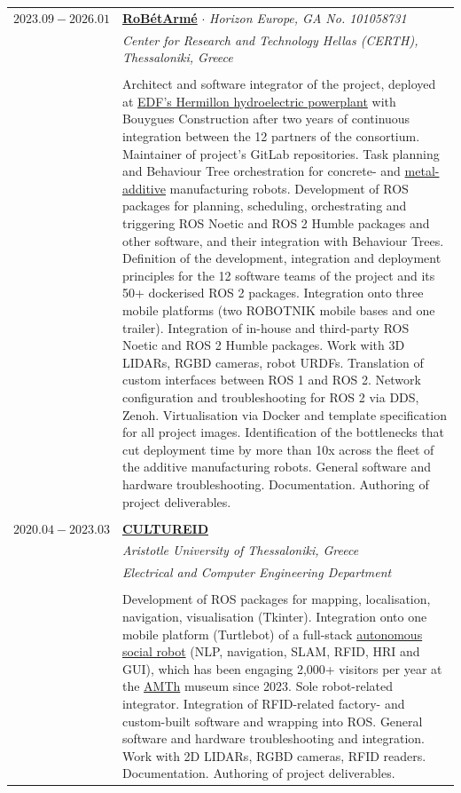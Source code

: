 \documentclass[a4paper,10pt,twoside]{article}
\begin{document}
\begin{tabular}{rp{11cm}}
$2023.09 - 2026.01$ & \href{https://www.robetarme-project.eu/}{\textbf{RoBétArmé}} $\cdot$ \textit{Horizon Europe, GA No. 101058731} \\
                           & \textit{Center for Research and Technology Hellas (CERTH), Thessaloniki, Greece}\\
\\
                           & Architect and software integrator of the project, deployed at \href{https://www.gem.wiki/Hermillon_hydroelectric_plant}{EDF's Hermillon hydroelectric powerplant} with Bouygues Construction after two years of continuous integration between the 12 partners of the consortium. Maintainer of project's GitLab repositories. Task planning and Behaviour Tree orchestration for concrete- and \href{https://www.youtube.com/watch?v=xuIbOL-MPRk}{metal-additive} manufacturing robots. Development of ROS packages for planning, scheduling, orchestrating and triggering ROS Noetic and ROS 2 Humble packages and other software, and their integration with Behaviour Trees. Definition of the development, integration and deployment principles for the 12 software teams of the project and its 50+ dockerised ROS 2 packages. Integration onto three mobile platforms (two ROBOTNIK mobile bases and one trailer). Integration of in-house and third-party ROS Noetic and ROS 2 Humble packages. Work with 3D LIDARs, RGBD cameras, robot URDFs. Translation of custom interfaces between ROS 1 and ROS 2. Network configuration and troubleshooting for ROS 2 via DDS, Zenoh. Virtualisation via Docker and template specification for all project images. Identification of the bottlenecks that cut deployment time by more than 10x across the fleet of the additive manufacturing robots. General software and hardware troubleshooting. Documentation. Authoring of project deliverables. \\
&\\
$2020.04 - 2023.03$ & \href{https://cultureid.web.auth.gr/?page\_id=216\&lang=en}{\textbf{CULTUREID}} \\
                    & \textit{Aristotle University of Thessaloniki, Greece}\\
                    & \textit{Electrical and Computer Engineering Department} \\
\\
                    & Development of ROS packages for mapping, localisation, navigation, visualisation (Tkinter). Integration onto one mobile platform (Turtlebot) of a full-stack \href{https://www.youtube.com/watch?v=2EvTGNOqTrs}{autonomous social robot} (NLP, navigation, SLAM, RFID, HRI and GUI), which has been engaging 2,000+ visitors per year at the \href{https://www.amth.gr/en}{AMTh} museum since 2023. Sole robot-related integrator. Integration of RFID-related factory- and custom-built software and wrapping into ROS. General software and hardware troubleshooting and integration. Work with 2D LIDARs, RGBD cameras, RFID readers. Documentation. Authoring of project deliverables.\\

\end{tabular}
\end{document}
